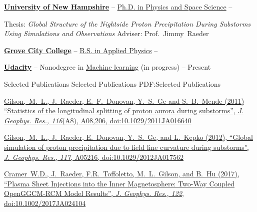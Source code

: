 \documentclass[letterpaper,MMMyyyy,nonstopmode]{simpleresumecv}
\begin{document}
\begin{Body}
\Entry
\href{http://www.unh.edu/}
{\textbf{University of New Hampshire}}
--
\href{http://physics.unh.edu/content/physics-phd}
{Ph.D. in Physics and Space Science}
\hfill
{} --

\Gap
\begin{Detail}
\BulletItem
Thesis: \textit{Global Structure of the Nightside Proton Precipitation During Substorms Using Simulations and Observations}
\BulletItem
Adviser:
Prof.~Jimmy~Raeder
\end{Detail}

\BigGap
\Entry
\href{http://www.gcc.edu/Pages/Grove-City-College.aspx}
{\textbf{Grove City College}}
--
\href{http://www.gcc.edu/academics/SEM/physics/Pages/default.aspx}
{B.S. in Applied Physics}
\hfill
{} -- 

\BigGap
\Entry
\href{https://www.udacity.com}
{\textbf{Udacity}}
--
Nanodegree in
\href{https://www.udacity.com/course/machine-learning-engineer-nanodegree--nd009}
{Machine learning} (in progress)
\hfill
{} -- Present





\Section
{Selected Publications}
{Selected Publications}
{PDF:Selected Publications}

\BigGap
\href{http://onlinelibrary.wiley.com/doi/10.1029/2011JA016640/abstract}
{\underline{Gilson,~M.~L.}, J.~Raeder, E.~F.~Donovan, Y.~S.~Ge and S.~B.~Mende (2011)
``Statistics of the longitudinal splitting of proton aurora during substorms'',
\textit{J. Geophys. Res., 116}(A8), A08,206, doi:10.1029/2011JA016640}

\BigGap
\href{http://onlinelibrary.wiley.com/doi/10.1029/2012JA017562/full}
{\underline{Gilson,~M.~L.}, J.~Raeder, E.~Donovan, Y.~S.~Ge, and L.~Kepko (2012), ``Global simulation of proton precipitation due to field line curvature during substorms",
\textit{J. Geophys. Res., 117}, A05216, doi:10.1029/2012JA017562}

\BigGap
\href{http://onlinelibrary.wiley.com/doi/10.1002/2017JA024104/full}
{Cramer~W.D., J.~Raeder, F.R.~Toffoletto, \underline{M.~L.~Gilson}, and B.~Hu (2017), ``Plasma Sheet Injections into the Inner Magnetosphere: Two-Way Coupled OpenGGCM-RCM Model Results'',
\textit{J. Geophys. Res., 122}, doi:10.1002/2017JA024104}




\end{Body}
\end{document}
